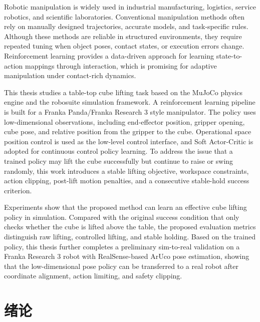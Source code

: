 \documentclass[
    type = bachelor,
    oneside,
    fontset = fandol
]{njuthesis}
\begin{document}
\begin{abstract*}
Robotic manipulation is widely used in industrial manufacturing, logistics, service robotics, and scientific laboratories. Conventional manipulation methods often rely on manually designed trajectories, accurate models, and task-specific rules. Although these methods are reliable in structured environments, they require repeated tuning when object poses, contact states, or execution errors change. Reinforcement learning provides a data-driven approach for learning state-to-action mappings through interaction, which is promising for adaptive manipulation under contact-rich dynamics.

This thesis studies a table-top cube lifting task based on the MuJoCo physics engine and the robosuite simulation framework. A reinforcement learning pipeline is built for a Franka Panda/Franka Research 3 style manipulator. The policy uses low-dimensional observations, including end-effector position, gripper opening, cube pose, and relative position from the gripper to the cube. Operational space position control is used as the low-level control interface, and Soft Actor-Critic is adopted for continuous control policy learning. To address the issue that a trained policy may lift the cube successfully but continue to raise or swing randomly, this work introduces a stable lifting objective, workspace constraints, action clipping, post-lift motion penalties, and a consecutive stable-hold success criterion.

Experiments show that the proposed method can learn an effective cube lifting policy in simulation. Compared with the original success condition that only checks whether the cube is lifted above the table, the proposed evaluation metrics distinguish raw lifting, controlled lifting, and stable holding. Based on the trained policy, this thesis further completes a preliminary sim-to-real validation on a Franka Research 3 robot with RealSense-based ArUco pose estimation, showing that the low-dimensional pose policy can be transferred to a real robot after coordinate alignment, action limiting, and safety clipping.

\end{abstract*}

\tableofcontents

\mainmatter

\chapter{绪论}
\end{document}
